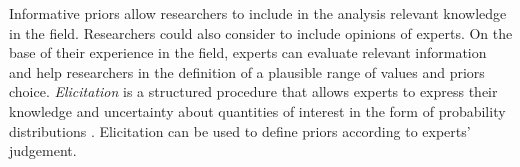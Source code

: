 \documentclass[graybox]{svmult}
\begin{document}
Informative priors allow researchers to include in the analysis relevant knowledge in the field. Researchers could also consider to include opinions of experts. On the base of their experience in the field, experts can evaluate relevant information and help researchers in the definition of a plausible range of values and priors choice. \emph{Elicitation} is a structured procedure that allows experts to express their knowledge and uncertainty about quantities of interest in the form of probability distributions \cite{ohaganExpertKnowledgeElicitation2019,ohaganUncertainJudgementsEliciting2006}. Elicitation can be used to define priors according to  experts' judgement.


\end{document}
